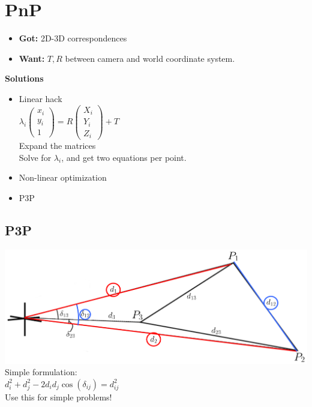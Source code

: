 \section{PnP}
\begin{itemize}
  \item \textbf{Got:} 2D-3D correspondences
  \item \textbf{Want:} $T, R$ between camera and world coordinate
    system.
\end{itemize}

\textbf{Solutions}
\begin{itemize}
  \item Linear hack\\
    $\lambda_i \begin{pmatrix} x_i \\ y_i \\ 1 \end{pmatrix} = R
    \begin{pmatrix}X_i \\ Y_i \\ Z_i \end{pmatrix} + T$\\
    Expand the matrices \\
    Solve for $\lambda_i$, and get two equations per point.
  \item Non-linear optimization
  \item P3P
\end{itemize}

\subsection*{P3P}
\includegraphics[width=\linewidth]{Images/P3P.png}
Simple formulation:\\
$d_i^2 + d_j^2 - 2 d_i d_j \cos(\delta_{ij}) = d_{ij}^2$\\
\alert{Use this for simple problems!}

